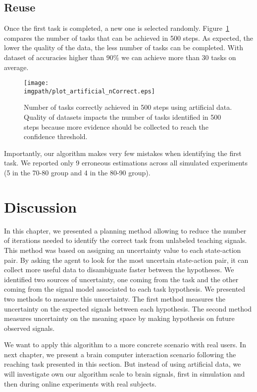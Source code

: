 \subsection{Reuse}

Once the first task is completed, a new one is selected randomly. Figure~\ref{fig:nCorrectArtificial} compares the number of tasks that can be achieved in 500 steps. As expected, the lower the quality of the data, the less number of tasks can be completed. With dataset of accuracies higher than $90\%$ we can achieve more than 30 tasks on average.

\begin{figure}[!htbp]
    \centering
    \texttt{[image: \\imgpath/plot\_artificial\_nCorrect.eps]}
    \caption{Number of tasks correctly achieved in 500 steps using artificial data. Quality of datasets impacts the number of tasks identified in 500 steps because more evidence should be collected to reach the confidence threshold.}
    \label{fig:nCorrectArtificial}
\end{figure} 

Importantly, our algorithm makes very few mistakes when identifying the first task. We reported only 9 erroneous estimations across all simulated experiments (5 in the 70-80 group and 4 in the 80-90 group).

\section{Discussion}

In this chapter, we presented a planning method allowing to reduce the number of iterations needed to identify the correct task from unlabeled teaching signals. This method was based on assigning an uncertainty value to each state-action pair. By asking the agent to look for the most uncertain state-action pair, it can collect more useful data to disambiguate faster between the hypotheses. We identified two sources of uncertainty, one coming from the task and the other coming from the signal model associated to each task hypothesis. We presented two methods to measure this uncertainty. The first method measures the uncertainty on the expected signals between each hypothesis. The second method measures uncertainty on the meaning space by making hypothesis on future observed signals.

We want to apply this algorithm to a more concrete scenario with real users. In next chapter, we present a brain computer interaction scenario following the reaching task presented in this section. But instead of using artificial data, we will investigate own our algorithm scale to brain signals, first in simulation and then during online experiments with real subjects.

